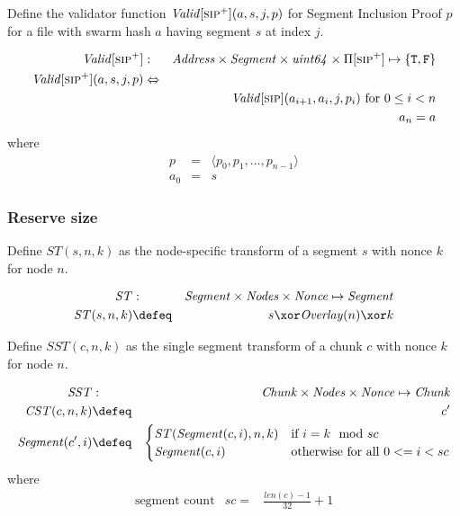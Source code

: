 \begin{definition}
\label{def:sip+-validity}
Define the validator function $\mathit{Valid}[\textsc{\lowercase{SIP}}^{+}](a,s,j,p)$ for Segment Inclusion Proof $p$ for a file with swarm hash $a$ having segment $s$ at index  $j$.

\begin{eqnarray}
\mathit{Valid}[\textsc{\lowercase{SIP}}^{+}]&:&\mathit{Address}\times\mathit{Segment}\times\mathit{uint64}\times\Pi[\textsc{\lowercase{SIP}}^{+}]\mapsto\{\mathtt{T,F}\}\\
\mathit{Valid}[\textsc{\lowercase{SIP}}^{+}](a,s,j,p)&\Leftrightarrow&\\
&&\mathit{Valid}[\textsc{\lowercase{SIP}}](a_{i+1}, a_i,j,p_i)
\text{ for }0\leq i<n\\
&&a_n=a
\end{eqnarray}
where
\begin{eqnarray}
p&=&\langle p_0, p_1, \ldots, p_{n-1}\rangle\\
a_0&=&s
\end{eqnarray}
\end{definition}



\subsubsection{Reserve size}
\begin{definition}
\label{def:st}
Define  $\mathit{ST}(s,n,k)$ as the node-specific  transform of a 
segment $s$ with nonce $k$ for node $n$.

\begin{eqnarray}
\mathit{ST}&: &\mathit{Segment}\times\mathit{Nodes}\times  \mathit{Nonce}\mapsto \mathit{Segment}
\\
\mathit{ST}(s,n,k) &\defeq &
s\xor \mathit{Overlay}(n) \xor k
\end{eqnarray}
\end{definition}



\begin{definition}
\label{def:sst}
Define  $\mathit{SST}(c,n,k)$ as the single segment transform of a chunk $c$ with nonce $k$ for node $n$.

\begin{eqnarray}
\mathit{SST}&: &\mathit{Chunk}\times\mathit{Nodes}\times  \mathit{Nonce}\mapsto \mathit{Chunk}
\\
\mathit{CST}(c,n,k) &\defeq &c'\\
\mathit{Segment}(c',i)&\defeq&\begin{cases}
\mathit{ST}(\mathit{Segment}(c,i), n, k)& \text{if } i = k  \mod sc\\
\mathit{Segment}(c,i) & \text{otherwise for all } 0<=i<sc 
\end{cases}
\end{eqnarray}
where
\begin{eqnarray}
\text{segment count} &sc =&\frac{\mathit{len}(c)-1}{32}+1 
\end{eqnarray}
\end{definition}

